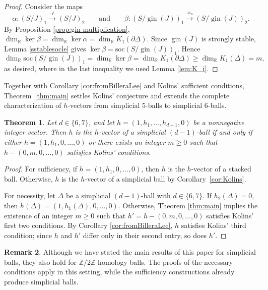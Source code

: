 \documentclass[11pt]{article}
\newtheorem{theorem}{Theorem}[section]
\theoremstyle{definition}
\newtheorem{remark}[theorem]{Remark}
\numberwithin{equation}{theorem}
\DeclareMathOperator{\gin}{gin}
\newcommand{\Z}{{\mathbb Z}}
\newcommand{\kk}{{\mathbb R}}
\newcommand{\Soc}{\mathrm{soc}}
\begin{document}
\begin{proof}
Consider the maps
\[
\alpha \colon (S/J)_1 \xrightarrow{\cdot\ell} (S/J)_{2}
\qquad\text{and}\qquad
\beta \colon (S/\gin(J))_1 \xrightarrow{\cdot x_n} (S/\gin(J))_{2}.
\]
By Proposition \ref{prop:gin-multiplication}, $\dim_\kk\ker\beta=\dim_\kk\ker\alpha=\dim_\kk K_1(\partial\Delta)$. 
Since $\gin(J)$ is strongly stable,  Lemma \ref{sstablesocle} gives $\ker \beta= \Soc(S/\gin(J))_1$.
Hence
\[
\dim_\kk\Soc(S/\gin(J))_1 =\dim_\kk\ker\beta
=\dim_\kk K_1(\partial\Delta) \ge\dim_\kk K_1(\Delta)=m,
\]
as desired, where in the last inequality we used Lemma \ref{lem:K_i}.
\end{proof}

Together with Corollary \ref{cor:fromBilleraLee} %
and Kolins’ sufficient conditions, Theorem~\ref{thm:main} settles Kolins’ conjecture and extends the complete characterization of $h$-vectors from simplicial $5$-balls to simplicial $6$-balls.


\begin{theorem}\label{thm:5-and-6-balls}
    Let $d\in\{6,7\}$, and let $h=(1,h_1,\ldots,h_{d-1},0)$ be a nonnegative integer vector. Then $h$ is the $h$-vector of a simplicial $(d-1)$-ball if and only if either $h=(1,h_1,0,\dots,0)$ or there exists an integer $m\geq 0$ such that $h-(0,m,0,\dots,0)$ satisfies Kolins' conditions. 
\end{theorem}


\begin{proof}
    For sufficiency, if $h=(1,h_1,0,\ldots,0)$, then $h$ is the $h$-vector of a stacked ball. Otherwise, $h$ is the $h$-vector of a simplicial ball by Corollary~\ref{cor:Kolins}.

   
For necessity, let $\Delta$ be a simplicial $(d-1)$-ball with $d\in\{6,7\}$.
If $h_2(\Delta)=0$, then $h(\Delta)=(1,h_1(\Delta),0,\ldots,0)$.
Otherwise, Theorem \ref{thm:main} implies the existence of an integer $m\geq 0$ such that
$h'=h-(0,m,0,\ldots,0)$ satisfies Kolins' first two conditions.
By Corollary \ref{cor:fromBilleraLee}, $h$ satisfies Kolins' third condition;
since $h$ and $h'$ differ only in their second entry, so does $h'$.
\end{proof}


\begin{remark}
Although we have stated the main results of this paper for simplicial balls, they also hold for $\Z/2\Z$-homology balls. The proofs of the necessary conditions apply in this setting, while the sufficiency constructions already produce simplicial balls.
\end{remark}
\end{document}
